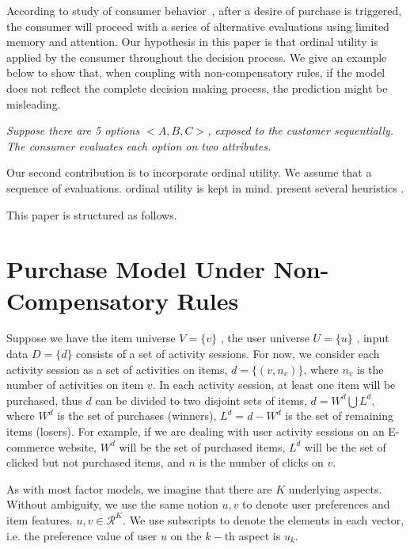 \documentclass[sigconf]{acmart}
\begin{document}
According to study of consumer behavior~\cite{Engel1986Consumer}, after a desire of purchase is triggered, the consumer will proceed with a series of alternative evaluations using limited memory and attention.  Our hypothesis in this paper is that ordinal utility is applied by the consumer throughout the decision process. We give an example below to show that, when coupling with non-compensatory rules, if the model does not reflect the complete decision making process, the prediction might be misleading.


\emph{Suppose there are 5 options $<A,B,C>$, exposed to the customer sequentially. The consumer evaluates each option on two attributes. }




%



Our second contribution is to incorporate ordinal utility. We assume that a sequence of evaluations. ordinal utility is kept in mind. present several heuristics .

  
  This paper is structured as follows. 
 



\section{Purchase Model Under Non-Compensatory Rules}\label{sec:model}

Suppose we have the item universe $V=\{v\}$ , the user universe $U=\{u\}$ , input data $D=\{d\}$ consists of a set of activity sessions. For now, we consider each activity session as a set of activities on items, $d=\{(v,n_v)\}$, where $n_v$ is the number of activities on item $v$.  In each activity session, at least one item will be purchased, thus $d$ can be divided to two disjoint sets of items, $d=W^d\bigcup L^d$, where $W^d$ is the set of purchases (winners), $L^d=d-W^d$ is the set of remaining items (losers). For example, if we are dealing with user activity sessions on an E-commerce website, $W^d$ will be the set of purchased items, $L^d$ will be the set of clicked but not purchased items, and $n$ is the number of clicks on $v$.


As with most factor models, we imagine that there are $K$ underlying aspects.  Without ambiguity, we use the same notion $u,v$ to denote user preferences and item features. $u,v\in \mathcal{R}^K$. We use subscripts to denote the elements in each vector, i.e. the preference value of user $u$ on the $k-$th aspect is $u_k$. 
\end{document}
